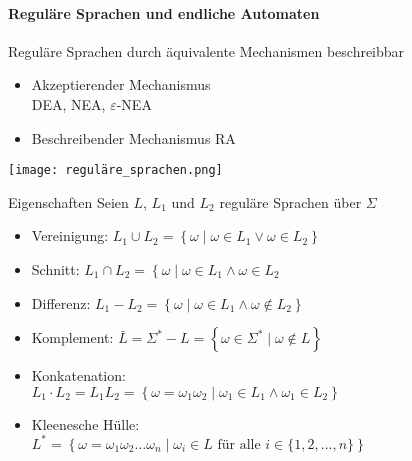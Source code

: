 \graphicspath{{images/}}

\paragraph{Reguläre Sprachen und endliche Automaten}

\begin{concept}{Reguläre Sprachen} durch äquivalente Mechanismen beschreibbar

    \begin{minipage}{0.6\linewidth}
        \begin{itemize}
            \item Akzeptierender Mechanismus\\
             DEA, NEA, $\varepsilon$-NEA
            \item Beschreibender Mechanismus RA
        \end{itemize}
    \end{minipage}
    \begin{minipage}{0.25\linewidth}
        \texttt{[image: reguläre\_sprachen.png]}
    \end{minipage}
\end{concept}

\begin{theorem}{Eigenschaften}
    Seien $L$, $L_{1}$ und $L_{2}$ reguläre Sprachen über $\Sigma$
    \begin{itemize}
        \item Vereinigung: $L_{1} \cup L_{2}=\left\{\omega \mid \omega \in L_{1} \vee \omega \in L_{2}\right\}$
        \item Schnitt: $L_{1} \cap L_{2}=\left\{\omega \mid \omega \in L_{1} \wedge \omega \in L_{2}\right.$
        \item Differenz: $L_{1}-L_{2}=\left\{\omega \mid \omega \in L_{1} \wedge \omega \notin L_{2}\right\}$
        \item Komplement: $\bar{L}=\Sigma^{*}-L=\left\{\omega \in \Sigma^{*} \mid \omega \notin L\right\}$
        \item Konkatenation:\\
        $L_{1} \cdot L_{2}=L_{1} L_{2}=\left\{\omega=\omega_{1} \omega_{2} \mid \omega_{1} \in L_{1} \wedge \omega_{1} \in L_{2}\right\}$
        \item Kleenesche Hülle:\\ 
        $L^{*}=\left\{\omega=\omega_{1} \omega_{2} \ldots \omega_{n} \mid \omega_{i} \in L \text { für alle } i \in\{1,2, \ldots, n\}\right\}$
    \end{itemize}
\end{theorem}

